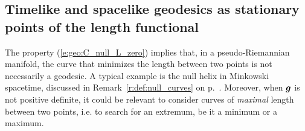 \subsection{Timelike and spacelike geodesics as stationary points
of the length functional} \label{s:geo:variation_length}

The property (\ref{e:geo:C_null_L_zero}) implies that, in a pseudo-Riemannian
manifold, the curve that minimizes the length between two points is not necessarily
a geodesic. A typical example is the null helix in Minkowski spacetime, discussed in
Remark~\ref{r:def:null_curves} on p.~\pageref{r:def:null_curves}. Moreover,
when $\bm{g}$ is not positive definite, it could be relevant to consider curves
of \emph{maximal} length between two points, i.e. to search for an extremum,
be it a minimum or a maximum.


